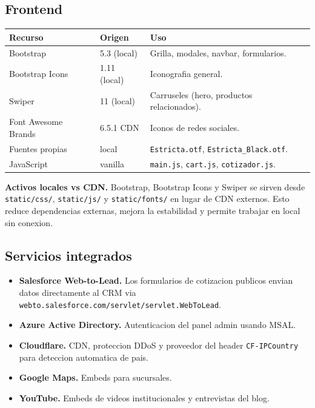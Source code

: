 \documentclass[11pt,a4paper]{article}
\begin{document}
\subsection{Frontend}

\begin{longtable}{l l p{7.5cm}}
\toprule
\textbf{Recurso} & \textbf{Origen} & \textbf{Uso} \\
\midrule
Bootstrap           & 5.3 (local)  & Grilla, modales, navbar, formularios. \\
Bootstrap Icons     & 1.11 (local) & Iconografia general. \\
Swiper              & 11 (local)   & Carruseles (hero, productos relacionados). \\
Font Awesome Brands & 6.5.1 CDN    & Iconos de redes sociales. \\
Fuentes propias     & local        & \texttt{Estricta.otf}, \texttt{Estricta\_Black.otf}. \\
JavaScript          & vanilla      & \texttt{main.js}, \texttt{cart.js}, \texttt{cotizador.js}. \\
\bottomrule
\end{longtable}

\begin{infobox}
\textbf{Activos locales vs CDN.} Bootstrap, Bootstrap Icons y Swiper se
sirven desde \texttt{static/css/}, \texttt{static/js/} y \texttt{static/fonts/}
en lugar de CDN externos. Esto reduce dependencias externas, mejora la
estabilidad y permite trabajar en local sin conexion.
\end{infobox}

\subsection{Servicios integrados}

\begin{itemize}[leftmargin=*]
    \item \textbf{Salesforce Web-to-Lead.} Los formularios de cotizacion
        publicos envian datos directamente al CRM via
        \texttt{webto.salesforce.com/servlet/servlet.WebToLead}.
    \item \textbf{Azure Active Directory.} Autenticacion del panel admin
        usando MSAL.
    \item \textbf{Cloudflare.} CDN, proteccion DDoS y proveedor del header
        \texttt{CF-IPCountry} para deteccion automatica de pais.
    \item \textbf{Google Maps.} Embeds para sucursales.
    \item \textbf{YouTube.} Embeds de videos institucionales y entrevistas
        del blog.
\end{itemize}
\end{document}
